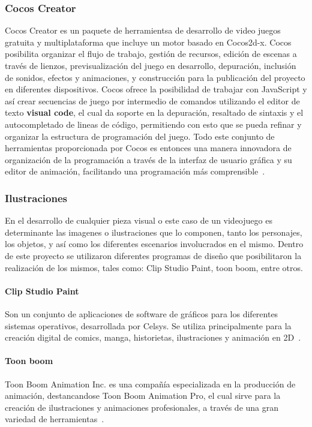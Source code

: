 \documentclass[journal,transmag]{IEEEtran}
\begin{document}
\subsubsection{Cocos Creator}
Cocos Creator es un paquete de herramientsa de desarrollo de video juegos gratuita y multiplataforma que incluye un motor basado en Cocos2d-x. Cocos posibilita organizar el flujo de trabajo, gestión de recursos, edición de escenas a través de lienzos, previsualización del juego en desarrollo, depuración, inclusión de sonidos, efectos y animaciones, y construcción para la publicación del proyecto en diferentes dispositivos. Cocos ofrece la posibilidad de trabajar con JavaScript y así crear secuencias de juego por intermedio de comandos utilizando el editor de texto \textbf{visual code}, el cual da soporte en la depuración, resaltado de sintaxis y el autocompletado de lineas de código, permitiendo con esto que se pueda refinar y organizar la estructura de programación del juego. Todo este conjunto de herramientas proporcionada por Cocos es entonces una manera innovadora de organización de la programación a través de la interfaz de usuario gráfica y su editor de animación, facilitando una programación más comprensible~\cite{Cocos}.

\subsubsection{Ilustraciones}
En el desarrollo de cualquier pieza visual o este caso de un videojuego es determinante las imagenes o ilustraciones que lo componen, tanto los personajes, los objetos, y así como los diferentes escenarios involucrados en el mismo. Dentro de este proyecto se utilizaron diferentes programas de diseño que posibilitaron la realización de los mismos, tales como: Clip Studio Paint, toon boom, entre otros.

\paragraph{Clip Studio Paint} Son un conjunto de aplicaciones de software de gráficos para los diferentes sistemas operativos, desarrollada por Celsys. Se utiliza principalmente para la creación digital de comics, manga, historietas, ilustraciones y animación en 2D~\cite{ClipP}.

\paragraph{Toon boom} Toon Boom Animation Inc. es una compañía especializada en la producción de animación, destancandose Toon Boom Animation Pro, el cual sirve para la creación de ilustraciones y animaciones profesionales, a través de una gran variedad de herramientas~\cite{ToonB}. 
\end{document}
